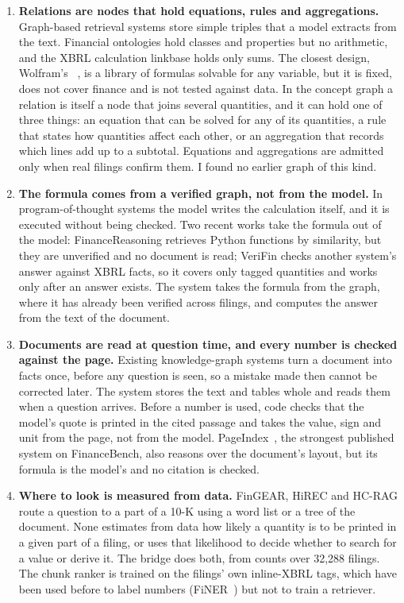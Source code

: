 \begin{enumerate}[label=(\arabic*)]
  \item \textbf{Relations are nodes that hold equations, rules and aggregations.} Graph-based retrieval systems store simple triples that a model extracts from the text. Financial ontologies hold classes and properties but no arithmetic, and the XBRL calculation linkbase holds only sums. The closest design, Wolfram's ~\citep{wolfram_formuladata}, is a library of formulas solvable for any variable, but it is fixed, does not cover finance and is not tested against data. In the concept graph a relation is itself a node that joins several quantities, and it can hold one of three things: an equation that can be solved for any of its quantities, a rule that states how quantities affect each other, or an aggregation that records which lines add up to a subtotal. Equations and aggregations are admitted only when real filings confirm them. I found no earlier graph of this kind.

  \item \textbf{The formula comes from a verified graph, not from the model.} In program-of-thought systems the model writes the calculation itself, and it is executed without being checked. Two recent works take the formula out of the model: FinanceReasoning retrieves Python functions by similarity, but they are unverified and no document is read; VeriFin checks another system's answer against XBRL facts, so it covers only tagged quantities and works only after an answer exists. The system takes the formula from the graph, where it has already been verified across filings, and computes the answer from the text of the document.

  \item \textbf{Documents are read at question time, and every number is checked against the page.} Existing knowledge-graph systems turn a document into facts once, before any question is seen, so a mistake made then cannot be corrected later. The system stores the text and tables whole and reads them when a question arrives. Before a number is used, code checks that the model's quote is printed in the cited passage and takes the value, sign and unit from the page, not from the model. PageIndex~\citep{vectify2026mafin}, the strongest published system on FinanceBench, also reasons over the document's layout, but its formula is the model's and no citation is checked.

  \item \textbf{Where to look is measured from data.} FinGEAR, HiREC and HC-RAG route a question to a part of a 10-K using a word list or a tree of the document. None estimates from data how likely a quantity is to be printed in a given part of a filing, or uses that likelihood to decide whether to search for a value or derive it. The bridge does both, from counts over 32,288 filings. The chunk ranker is trained on the filings' own inline-XBRL tags, which have been used before to label numbers (FiNER~\citep{loukas2022finer}) but not to train a retriever.
\end{enumerate}
